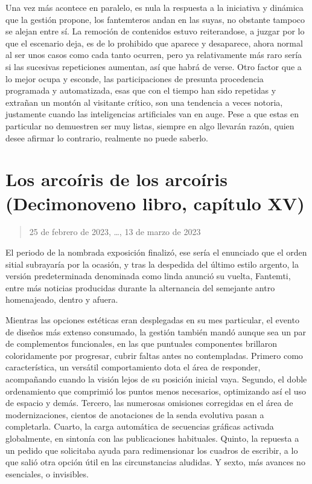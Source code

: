 \documentclass[
]{book}
\begin{document}
Una vez más acontece en paralelo, es nula la respuesta a la iniciativa y dinámica que la gestión propone, los fantemteros andan en las suyas, no obstante tampoco se alejan entre sí. La remoción de contenidos estuvo reiterandose, a juzgar por lo que el escenario deja, es de lo prohibido que aparece y desaparece, ahora normal al ser unos casos como cada tanto ocurren, pero ya relativamente más raro sería si las sucesivas repeticiones aumentan, así que habrá de verse. Otro factor que a lo mejor ocupa y esconde, las participaciones de presunta procedencia programada y automatizada, esas que con el tiempo han sido repetidas y extrañan un montón al visitante crítico, son una tendencia a veces notoria, justamente cuando las inteligencias artificiales van en auge. Pese a que estas en particular no demuestren ser muy listas, siempre en algo llevarán razón, quien desee afirmar lo contrario, realmente no puede saberlo.

\hypertarget{los-arcouxedris-de-los-arcouxedris-decimonoveno-libro-capuxedtulo-xv}{%
\section{Los arcoíris de los arcoíris (Decimonoveno libro, capítulo XV)}\label{los-arcouxedris-de-los-arcouxedris-decimonoveno-libro-capuxedtulo-xv}}

\begin{quote}
25 de febrero de 2023, \ldots, 13 de marzo de 2023
\end{quote}

El periodo de la nombrada exposición finalizó, ese sería el enunciado que el orden sitial subrayaría por la ocasión, y tras la despedida del último estilo argento, la versión predeterminada denominada como linda anunció su vuelta, Fantemti, entre más noticias producidas durante la alternancia del semejante antro homenajeado, dentro y afuera.

Mientras las opciones estéticas eran desplegadas en su mes particular, el evento de diseños más extenso consumado, la gestión también mandó aunque sea un par de complementos funcionales, en las que puntuales componentes brillaron coloridamente por progresar, cubrir faltas antes no contempladas. Primero como característica, un versátil comportamiento dota el área de responder, acompañando cuando la visión lejos de su posición inicial vaya. Segundo, el doble ordenamiento que comprimió los puntos menos necesarios, optimizando así el uso de espacio y demás. Tercero, las numerosas omisiones corregidas en el área de modernizaciones, cientos de anotaciones de la senda evolutiva pasan a completarla. Cuarto, la carga automática de secuencias gráficas activada globalmente, en sintonía con las publicaciones habituales. Quinto, la repuesta a un pedido que solicitaba ayuda para redimensionar los cuadros de escribir, a lo que salió otra opción útil en las circunstancias aludidas. Y sexto, más avances no esenciales, o invisibles.
\end{document}
